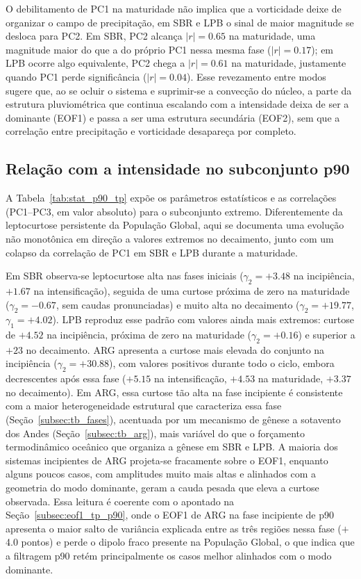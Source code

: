 O debilitamento de PC1 na maturidade não implica que a vorticidade deixe de organizar o campo de precipitação, em SBR e LPB o sinal de maior magnitude se desloca para PC2. Em SBR, PC2 alcança $|r|=0.65$ na maturidade, uma magnitude maior do que a do próprio PC1 nessa mesma fase ($|r|=0.17$); em LPB ocorre algo equivalente, PC2 chega a $|r|=0.61$ na maturidade, justamente quando PC1 perde significância ($|r|=0.04$). Esse revezamento entre modos sugere que, ao se ocluir o sistema e suprimir-se a convecção do núcleo, a parte da estrutura pluviométrica que continua escalando com a intensidade deixa de ser a dominante (EOF1) e passa a ser uma estrutura secundária (EOF2), sem que a correlação entre precipitação e vorticidade desapareça por completo.



\subsection{Relação com a intensidade no subconjunto p90}\label{subsec:pc1_p90_tp}

A Tabela~\ref{tab:stat_p90_tp} expõe os parâmetros estatísticos e as correlações (PC1--PC3, em valor absoluto) para o subconjunto extremo. Diferentemente da leptocurtose persistente da População Global, aqui se documenta uma evolução não monotônica em direção a valores extremos no decaimento, junto com um colapso da correlação de PC1 em SBR e LPB durante a maturidade.

Em SBR observa-se leptocurtose alta nas fases iniciais ($\gamma_2 = +3.48$ na incipiência, $+1.67$ na intensificação), seguida de uma curtose próxima de zero na maturidade ($\gamma_2 = -0.67$, sem caudas pronunciadas) e muito alta no decaimento ($\gamma_2 = +19.77$, $\gamma_1 = +4.02$). LPB reproduz esse padrão com valores ainda mais extremos: curtose de $+4.52$ na incipiência, próxima de zero na maturidade ($\gamma_2 = +0.16$) e superior a $+23$ no decaimento. ARG apresenta a curtose mais elevada do conjunto na incipiência ($\gamma_2 = +30.88$), com valores positivos durante todo o ciclo, embora decrescentes após essa fase ($+5.15$ na intensificação, $+4.53$ na maturidade, $+3.37$ no decaimento). Em ARG, essa curtose tão alta na fase incipiente é consistente com a maior heterogeneidade estrutural que caracteriza essa fase (Seção~\ref{subsec:tb_fases}), acentuada por um mecanismo de gênese a sotavento dos Andes (Seção~\ref{subsec:tb_arg}), mais variável do que o forçamento termodinâmico oceânico que organiza a gênese em SBR e LPB. A maioria dos sistemas incipientes de ARG projeta-se fracamente sobre o EOF1, enquanto alguns poucos casos, com amplitudes muito mais altas e alinhados com a geometria do modo dominante, geram a cauda pesada que eleva a curtose observada. Essa leitura é coerente com o apontado na Seção~\ref{subsec:eof1_tp_p90}, onde o EOF1 de ARG na fase incipiente de p90 apresenta o maior salto de variância explicada entre as três regiões nessa fase ($+$4.0 pontos) e perde o dipolo fraco presente na População Global, o que indica que a filtragem p90 retém principalmente os casos melhor alinhados com o modo dominante.

